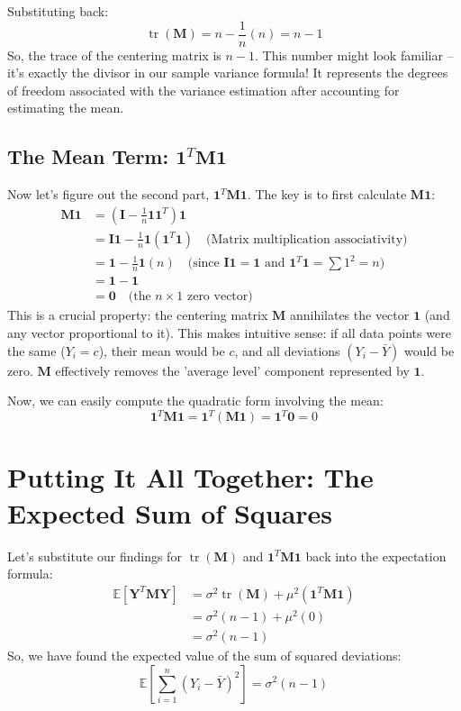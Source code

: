 \documentclass[11pt]{article}
\newcommand{\E}{\mathbb{E}} %
\newcommand{\tr}{\operatorname{tr}} %
\newcommand{\bY}{\bm{Y}} %
\newcommand{\bM}{\mathbf{M}} %
\newcommand{\bI}{\mathbf{I}} %
\newcommand{\bone}{\mathbf{1}} %
\newcommand{\bzero}{\mathbf{0}} %
\begin{document}
Substituting back:
\[ \tr(\bM) = n - \frac{1}{n}(n) = n - 1 \]
So, the trace of the centering matrix is $n-1$. This number might look familiar – it's exactly the divisor in our sample variance formula! It represents the degrees of freedom associated with the variance estimation after accounting for estimating the mean.

\subsection{The Mean Term: \texorpdfstring{$\bone^T \bM \bone$}{1T M 1}}

Now let's figure out the second part, $\bone^T \bM \bone$. The key is to first calculate $\bM\bone$:
\begin{align*}
\bM\bone &= \left(\bI - \frac{1}{n}\bone\bone^T\right)\bone \\
&= \bI\bone - \frac{1}{n}\bone(\bone^T\bone) \quad \text{(Matrix multiplication associativity)} \\
&= \bone - \frac{1}{n}\bone(n) \quad \text{(since } \bI\bone=\bone \text{ and } \bone^T\bone = \sum 1^2 = n) \\
&= \bone - \bone \\
&= \bzero \quad \text{(the } n \times 1 \text{ zero vector)}
\end{align*}
This is a crucial property: the centering matrix $\bM$ annihilates the vector $\bone$ (and any vector proportional to it). This makes intuitive sense: if all data points were the same ($Y_i = c$), their mean would be $c$, and all deviations $(Y_i - \bar{Y})$ would be zero. $\bM$ effectively removes the 'average level' component represented by $\bone$.

Now, we can easily compute the quadratic form involving the mean:
\[ \bone^T \bM \bone = \bone^T (\bM\bone) = \bone^T \bzero = 0 \]

\section{Putting It All Together: The Expected Sum of Squares}

Let's substitute our findings for $\tr(\bM)$ and $\bone^T \bM \bone$ back into the expectation formula:
\begin{align*}
\E[\bY^T \bM \bY] &= \sigma^2 \tr(\bM) + \mu^2 (\bone^T \bM \bone) \\
&= \sigma^2 (n-1) + \mu^2 (0) \\
&= \sigma^2 (n-1)
\end{align*}
So, we have found the expected value of the sum of squared deviations:
\[ \E\left[ \sum_{i=1}^n (Y_i - \bar{Y})^2 \right] = \sigma^2 (n-1) \]
\end{document}
